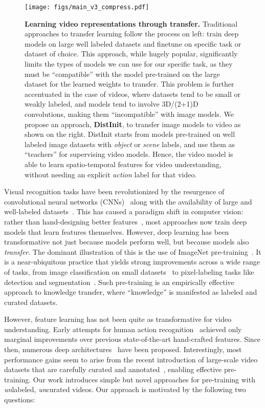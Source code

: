 \documentclass[10pt,twocolumn,letterpaper]{article}
\newcommand{\METHOD}[0]{DistInit}
\begin{document}
\begin{figure}[t]
	\centering
    \texttt{[image: figs/main\_v3\_compress.pdf]}
    \caption{
    {\bf Learning video representations through transfer.}
    Traditional approaches to transfer learning follow the process on left:
    train deep models on large well labeled datasets and finetune on specific task or dataset of choice.
    This approach, while hugely popular, significantly limits the types of models we can use for our specific task, as they must be
    ``compatible'' with the model pre-trained on the large dataset for the learned weights to transfer. This problem is further accentuated in the case of videos, where datasets tend to be small
    or weakly labeled, and models tend to involve 3D/(2+1)D convolutions, making them ``incompatible'' with image models.
    We propose an approach, {\bf \METHOD{}}, to transfer image models to video as shown on the right.
    \METHOD{} starts from models pre-trained on well labeled image datasets with {\em object} or {\em scene} labels, and use them as ``teachers'' for supervising video models. Hence, the video model 
    is able to learn
    spatio-temporal features for video understanding, without needing an explicit {\em action} label for that video.
    }
    \label{fig:teaser}
\end{figure}

Visual recognition tasks have been revolutionized 
by the resurgence of convolutional neural networks (CNNs)~\cite{lecun1998gradient, lecun2015deep} along with the availability of large and well-labeled datasets~\cite{ImageNet,zhou2017places,lin2014microsoft}. This has caused a paradigm shift in computer vision: 
rather than hand-designing better features~\cite{Dalal05,lowe2004distinctive,laptev2005space}, most approaches now train deep models that learn features themselves.
However, deep learning has been transformative not just because models perform well, but because models also {\em transfer}. The dominant illustration of this is the use of ImageNet pre-training~\cite{ImageNet}. It is a near-ubiquitous practice that yields strong improvements across a wide range of tasks, from image classification on small datasets~\cite{krahenbuhl2015data} to pixel-labeling tasks like detection and segmentation~\cite{he2017mask}. Such pre-training is an empirically effective approach to knowledge transfer, where ``knowledge'' is manifested as labeled and curated datasets. 

However, feature learning has not been quite as transformative for video understanding. Early attempts for human action recognition~\cite{Karpathy_14} achieved only marginal improvements over previous state-of-the-art hand-crafted features. Since then, numerous deep architectures~\cite{Simonyan_14b,tran2018closer,Girdhar_17a_ActionVLAD,girdhar2019video,LRCN,Feichtenhofer_16b} have been proposed. 
Interestingly, most performance gains seem to arise from the recent introduction of large-scale video datasets that are carefully curated and annotated~\cite{carreira2017quo,kay2017kinetics}, enabling effective pre-training. Our work introduces simple but novel approaches for pre-training with {\em  un}labeled, {\em un}curated videos. Our approach is motivated by the following two questions:
\end{document}
